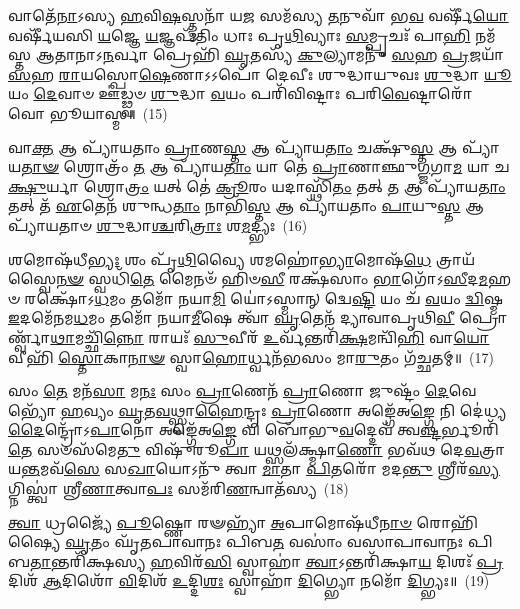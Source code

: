 𑌵𑌾𑌤𑍇᳴\-\ul{𑌨𑌾}\-\-𑌽𑌸𑍍𑌯 \ul{𑌹}\-𑌵𑌿\-\ul{𑌷}\-𑌸𑍍𑌤𑍍𑌮𑌨𑌾᳴ 𑌯\-\ul{𑌜} 𑌸𑌮᳴𑌸𑍍𑌯 \ul{𑌤}\-𑌨𑍁𑌵𑌾᳴ 𑌭\-\ul{𑌵} 𑌵𑌰𑍍\mbox{}𑌷𑍀᳴\-\ul{𑌯𑍋} 𑌵𑌰𑍍\mbox{}𑌷𑍀᳴𑌯𑌸𑌿 \ul{𑌯}\-𑌜𑍍𑌞𑍇 \ul{𑌯}\-𑌜𑍍𑌞𑌪᳴𑌤𑌿𑌂 𑌧𑌾𑌃 𑌪𑍃\-\ul{𑌥𑌿}\-𑌵𑍍𑌯𑌾𑌃 \ul{𑌸}\-𑌮𑍍𑌪𑍃𑌚𑌃᳴ 𑌪𑌾\-\ul{𑌹𑌿} 𑌨𑌮᳴𑌸𑍍𑌤 𑌆𑌤𑌾𑌨𑌾\-𑌽\-\ul{𑌨}\-𑌰𑍍𑌵𑌾 𑌪𑍍𑌰𑍇𑌹𑌿᳴ \ul{𑌘𑍃}\-𑌤𑌸𑍍𑌯᳴ \ul{𑌕𑍁}\-𑌲𑍍𑌯𑌾𑌮𑌨𑍁᳴ \ul{𑌸}\-𑌹 \ul{𑌪𑍍𑌰}\-𑌜𑌯𑌾᳴ \ul{𑌸}\-𑌹 \ul{𑌰𑌾}\-𑌯𑌸𑍍𑌪𑍋\-\ul{𑌷𑍇}\-𑌣𑌾\-𑌽\-𑌽𑌪𑍋᳴ 𑌦𑍇𑌵𑍀𑌃 𑌶𑍁𑌦𑍍𑌧𑌾𑌯𑍁𑌵𑌃 \ul{𑌶𑍁}\-𑌦𑍍𑌧𑌾 \ul{𑌯𑍂}\-𑌯𑌂 \ul{𑌦𑍇}\-𑌵𑌾𑍞 𑌊॑𑌡𑍍𑌢𑍍𑌵𑍞 \ul{𑌶𑍁}\-𑌦𑍍𑌧𑌾 \ul{𑌵}\-𑌯𑌂 𑌪𑌰𑌿᳴𑌵𑌿𑌷𑍍𑌟𑌾𑌃 𑌪𑌰𑌿\-\ul{𑌵𑍇}\-𑌷𑍍𑌟𑌾𑌰𑍋᳴ 𑌵𑍋 𑌭𑍂𑌯𑌾𑌸𑍍𑌮॥~(15)

{\anuvakamend[{\-\ul{𑌦𑍇}\-𑌵𑍇\-\ul{𑌨} 𑌚𑌤𑍁᳴𑌶𑍍𑌚𑌤𑍍𑌵𑌾𑌰𑌿𑍞𑌶𑌚𑍍𑌚}]}%

𑌵𑌾\-\ul{𑌕𑍍𑌤} 𑌆 𑌪𑍍𑌯𑌾᳴𑌯𑌤𑌾𑌂 \ul{𑌪𑍍𑌰𑌾}\-𑌣\-\ul{𑌸𑍍𑌤} 𑌆 𑌪𑍍𑌯𑌾᳴𑌯\-\ul{𑌤𑌾𑌂} 𑌚𑌕𑍍𑌷𑍁᳴\-\ul{𑌸𑍍𑌤} 𑌆 𑌪𑍍𑌯𑌾᳴𑌯\-\ul{𑌤𑌾}\-\-\ul{𑍟} 𑌶𑍍𑌰𑍋𑌤𑍍𑌰𑌂᳴ \ul{𑌤} 𑌆 𑌪𑍍𑌯𑌾᳴𑌯\-\ul{𑌤𑌾𑌂} 𑌯𑌾 𑌤𑍇॑ \ul{𑌪𑍍𑌰𑌾}\-𑌣𑌾𑌞𑍍𑌛𑍁\-\ul{𑌗𑍍𑌜}\-𑌗𑌾\-\ul{𑌮} 𑌯𑌾 𑌚\-\ul{𑌕𑍍𑌷𑍁}\-𑌰𑍍𑌯𑌾 𑌶𑍍𑌰𑍋\-\ul{𑌤𑍍𑌰𑌂} 𑌯𑌤𑍍 𑌤𑍇॑ \ul{𑌕𑍍𑌰𑍂}\-𑌰𑌂 𑌯𑌦𑌾𑌸𑍍𑌥𑌿᳴\-\ul{𑌤𑌂} 𑌤𑌤𑍍 \ul{𑌤} 𑌆 𑌪𑍍𑌯𑌾᳴𑌯\-\ul{𑌤𑌾𑌂} 𑌤𑌤𑍍 𑌤᳴ \ul{𑌏}\-𑌤𑍇𑌨᳴ 𑌶𑍁𑌨𑍍𑌧\-\ul{𑌤𑌾𑌂} 𑌨𑌾𑌭𑌿᳴\-\ul{𑌸𑍍𑌤} 𑌆 𑌪𑍍𑌯𑌾᳴𑌯𑌤𑌾𑌂 \ul{𑌪𑌾}\-𑌯𑍁\-\ul{𑌸𑍍𑌤} 𑌆 𑌪𑍍𑌯𑌾᳴𑌯𑌤𑌾𑍞 \ul{𑌶𑍁}\-𑌦𑍍𑌧𑌾\-\ul{𑌶𑍍𑌚}\-𑌰𑌿\-\ul{𑌤𑍍𑌰𑌾𑌃} 𑌶\-\ul{𑌮}\-𑌦𑍍𑌭𑍍𑌯𑌃~(16)

𑌶𑌮𑍋𑌷᳴𑌧𑍀\-\ul{𑌭𑍍𑌯𑌃} 𑌶𑌂 𑌪𑍃᳴\-\ul{𑌥𑌿}\-𑌵𑍍𑌯𑍈 𑌶𑌮𑌹𑍋॑\-\ul{𑌭𑍍𑌯𑌾}\-𑌮𑍋𑌷᳴\-\ul{𑌧𑍇} 𑌤𑍍𑌰𑌾𑌯᳴𑌸𑍍𑌵𑍈\-\ul{𑌨}\-\-\ul{𑍟} 𑌸𑍍𑌵𑌧𑌿᳴\-\ul{𑌤𑍇} 𑌮𑍈𑌨𑍞᳴ 𑌹𑌿𑍞\-\ul{𑌸𑍀} 𑌰𑌕𑍍𑌷᳴𑌸𑌾𑌂 \ul{𑌭𑌾}\-𑌗𑍋᳴\-𑌽\-\ul{𑌸𑍀}\-𑌦\-\ul{𑌮}\-𑌹𑍞 𑌰𑌕𑍍𑌷𑍋᳴\-𑌽\-\ul{𑌧}\-𑌮𑌂 𑌤𑌮𑍋᳴ 𑌨𑌯𑌾\-\ul{𑌮𑌿} 𑌯𑍋॑\-𑌽𑌸𑍍𑌮𑌾𑌨𑍍 𑌦𑍍𑌵𑍇\-\ul{𑌷𑍍𑌟𑌿} 𑌯𑌂 𑌚᳴ \ul{𑌵}\-𑌯𑌂 \ul{𑌦𑍍𑌵𑌿}\-𑌷𑍍𑌮 \ul{𑌇}\-𑌦𑌮𑍇᳴𑌨𑌮\-\ul{𑌧}\-𑌮𑌂 𑌤𑌮𑍋᳴ 𑌨𑌯𑌾\-\ul{𑌮𑍀}\-𑌷𑍇 𑌤𑍍𑌵𑌾᳴ \ul{𑌘𑍃}\-𑌤𑍇𑌨᳴ 𑌦𑍍𑌯𑌾𑌵𑌾𑌪𑍃𑌥𑌿\-\ul{𑌵𑍀} 𑌪𑍍𑌰𑍋𑌰𑍍𑌣𑍍𑌵𑌾᳴\-\ul{𑌥𑌾}\-𑌮𑌚𑍍𑌛𑌿᳴\-\ul{𑌨𑍍𑌨𑍋} 𑌰𑌾𑌯𑌃᳴ \ul{𑌸𑍁}\-𑌵𑍀𑌰᳴ \ul{𑌉}\-𑌰𑍍𑌵᳴𑌨𑍍𑌤𑌰𑌿᳴\-\ul{𑌕𑍍𑌷}\-𑌮𑌨𑍍𑌵𑌿᳴\-\ul{𑌹𑌿} 𑌵𑌾\-\ul{𑌯𑍋} 𑌵𑍀𑌹𑌿᳴ \ul{𑌸𑍍𑌤𑍋}\-𑌕𑌾\-\ul{𑌨𑌾}\-\-\ul{𑍟} 𑌸𑍍𑌵𑌾\-\ul{𑌹𑍋}\-𑌰𑍍𑌧𑍍𑌵𑌨᳴𑌭𑌸𑌂 𑌮𑌾\-\ul{𑌰𑍁}\-𑌤𑌂 𑌗᳴𑌚𑍍𑌛𑌤𑌮𑍍॥~(17)

{\anuvakamend[{\-\ul{𑌅}\-𑌦𑍍𑌭𑍍𑌯𑍋 𑌵𑍀\-\ul{𑌹𑌿} 𑌪𑌞𑍍𑌚᳴ 𑌚}]}%

𑌸𑌂 \ul{𑌤𑍇} 𑌮𑌨᳴\-\ul{𑌸𑌾} 𑌮\-\ul{𑌨𑌃} 𑌸𑌂 \ul{𑌪𑍍𑌰𑌾}\-𑌣𑍇𑌨᳴ \ul{𑌪𑍍𑌰𑌾}\-𑌣𑍋 𑌜𑍁𑌷𑍍𑌟𑌂᳴ \ul{𑌦𑍇}\-𑌵𑍇𑌭𑍍𑌯𑍋᳴ \ul{𑌹}\-𑌵𑍍𑌯𑌂 \ul{𑌘𑍃}\-𑌤\-\ul{𑌵}\-𑌥𑍍𑌸𑍍𑌵𑌾\-\ul{𑌹𑍈}\-𑌨𑍍𑌦𑍍𑌰𑌃 \ul{𑌪𑍍𑌰𑌾}\-𑌣𑍋 𑌅𑌙𑍍𑌗𑍇᳴𑌅\-\ul{𑌙𑍍𑌗𑍇} 𑌨𑌿 𑌦𑍇॑𑌧𑍍𑌯\-\ul{𑌦𑍈}\-𑌨𑍍𑌦𑍍𑌰𑍋᳴\-𑌽\-\ul{𑌪𑌾}\-𑌨𑍋 𑌅𑌙𑍍𑌗𑍇᳴𑌅\-\ul{𑌙𑍍𑌗𑍇} 𑌵𑌿 𑌬𑍋᳴𑌭𑍁\-\ul{𑌵}\-𑌦𑍍𑌦𑍇𑌵᳴ 𑌤𑍍𑌵\-\ul{𑌷𑍍𑌟}\-𑌰𑍍𑌭𑍂𑌰𑌿᳴ \ul{𑌤𑍇} 𑌸𑍞𑌸᳴𑌮𑍇\-\ul{𑌤𑍁} 𑌵𑌿𑌷𑍁᳴𑌰𑍂\-\ul{𑌪𑌾} 𑌯𑌥𑍍𑌸𑌲᳴𑌕𑍍𑌷𑍍𑌮𑌾\-\ul{𑌣𑍋} 𑌭𑌵᳴𑌥 𑌦𑍇\-\ul{𑌵}\-𑌤𑍍𑌰𑌾 𑌯\-\ul{𑌨𑍍𑌤}\-𑌮𑌵᳴\-\ul{𑌸𑍇} 𑌸\-\ul{𑌖𑌾}\-𑌯𑍋\-𑌽𑌨𑍁᳴ 𑌤𑍍𑌵𑌾 \ul{𑌮𑌾}\-𑌤𑌾 \ul{𑌪𑌿}\-𑌤𑌰𑍋᳴ 𑌮𑌦\-\ul{𑌨𑍍𑌤𑍁} 𑌶𑍍𑌰𑍀𑌰᳴\-\ul{𑌸𑍍𑌯}\-𑌗𑍍𑌨𑌿𑌸𑍍𑌤𑍍𑌵𑌾॑ 𑌶𑍍𑌰𑍀\-\ul{𑌣𑌾}\-𑌤𑍍𑌵𑌾\-\ul{𑌪𑌃} 𑌸𑌮᳴𑌰𑌿\-\ul{𑌣}\-𑌨𑍍𑌵𑌾𑌤᳴𑌸𑍍𑌯~(18)

\-\ul{𑌤𑍍𑌵𑌾} 𑌧𑍍𑌰𑌜𑍍𑌯𑍈᳴ \ul{𑌪𑍂}\-𑌷𑍍𑌣𑍋 𑌰𑍟𑌹𑍍𑌯𑌾᳴ \ul{𑌅}\-𑌪𑌾𑌮𑍋𑌷᳴𑌧𑍀\-\ul{𑌨𑌾}\-\-\ul{𑍞} 𑌰𑍋𑌹𑌿᳴𑌷𑍍𑌯𑍈 \ul{𑌘𑍃}\-𑌤𑌂 𑌘𑍃᳴𑌤𑌪𑌾𑌵𑌾𑌨𑌃 𑌪𑌿𑌬\-\ul{𑌤} 𑌵𑌸𑌾𑌂॑ 𑌵𑌸𑌾𑌪𑌾𑌵𑌾𑌨𑌃 𑌪𑌿𑌬\-\ul{𑌤𑌾}\-𑌨𑍍𑌤𑌰𑌿᳴𑌕𑍍𑌷𑌸𑍍𑌯 \ul{𑌹}\-𑌵𑌿𑌰᳴\-\ul{𑌸𑌿} 𑌸𑍍𑌵𑌾𑌹𑌾॑ \ul{𑌤𑍍𑌵𑌾}\-\-𑌽𑌨𑍍𑌤𑌰𑌿᳴𑌕𑍍𑌷𑌾\-\ul{𑌯} 𑌦𑌿𑌶𑌃᳴ \ul{𑌪𑍍𑌰}\-𑌦𑌿𑌶᳴ \ul{𑌆}\-𑌦𑌿𑌶𑍋᳴ \ul{𑌵𑌿}\-𑌦𑌿𑌶᳴ \ul{𑌉}\-𑌦𑍍𑌦𑌿\-\ul{𑌶𑌃} 𑌸𑍍𑌵𑌾𑌹𑌾᳴ \ul{𑌦𑌿}\-𑌗𑍍𑌭𑍍𑌯𑍋 𑌨𑌮𑍋᳴ \ul{𑌦𑌿}\-𑌗𑍍𑌭𑍍𑌯𑌃॥~(19)


